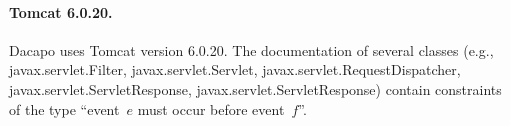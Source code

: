 \documentclass{sigplanconf}[10pt] %
\begin{document}
\paragraph{Tomcat 6.0.20.}
Dacapo uses Tomcat version 6.0.20. The documentation of several classes (e.g., \textsf{javax.servlet.Filter}, \textsf{javax.servlet.Servlet}, \textsf{javax.servlet.RequestDispatcher}, \textsf{javax.servlet.ServletResponse}, \textsf{javax.servlet.ServletResponse}) contain constraints of the type ``event~$e$ must occur before event~$f$''.
%
\end{document}
